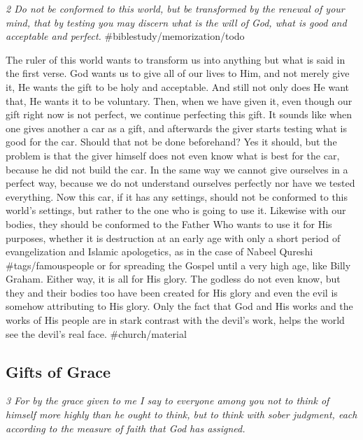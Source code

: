 \emph{2 Do not be conformed to this world, but be transformed by the
renewal of your mind, that by testing you may discern what is the will
of God, what is good and acceptable and perfect.}
\#biblestudy/memorization/todo

The ruler of this world wants to transform us into anything but what is
said in the first verse. God wants us to give all of our lives to Him,
and not merely give it, He wants the gift to be holy and acceptable. And
still not only does He want that, He wants it to be voluntary. Then,
when we have given it, even though our gift right now is not perfect, we
continue perfecting this gift. It sounds like when one gives another a
car as a gift, and afterwards the giver starts testing what is good for
the car. Should that not be done beforehand? Yes it should, but the
problem is that the giver himself does not even know what is best for
the car, because he did not build the car. In the same way we cannot
give ourselves in a perfect way, because we do not understand ourselves
perfectly nor have we tested everything. Now this car, if it has any
settings, should not be conformed to this world's settings, but rather
to the one who is going to use it. Likewise with our bodies, they should
be conformed to the Father Who wants to use it for His purposes, whether
it is destruction at an early age with only a short period of
evangelization and Islamic apologetics, as in the case of Nabeel Qureshi
\#tags/famouspeople or for spreading the Gospel until a very high age,
like Billy Graham. Either way, it is all for His glory. The godless do
not even know, but they and their bodies too have been created for His
glory and even the evil is somehow attributing to His glory. Only the
fact that God and His works and the works of His people are in stark
contrast with the devil's work, helps the world see the devil's real
face. \#church/material

\subsection{Gifts of Grace} \emph{3 For by the grace given to me I say to
everyone among you not to think of himself more highly than he ought to
think, but to think with sober judgment, each according to the measure
of faith that God has assigned.}


